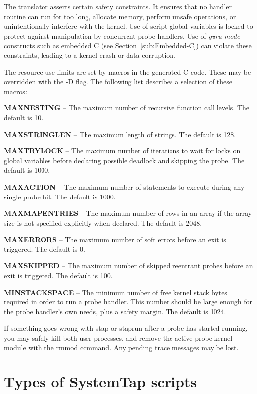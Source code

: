 \documentclass[twoside,english]{article}
\begin{document}
The translator asserts certain safety constraints. It
ensures that no handler routine can run for too long, allocate memory, perform
unsafe operations, or unintentionally interfere with the kernel. Use of script
global variables is locked to protect against manipulation by concurrent
probe handlers. Use of \emph{guru mode} constructs such as embedded C (see
Section~\ref{sub:Embedded-C}) can violate these constraints, leading to
a kernel crash or data corruption.

The resource use limits are set by macros in the generated C code. These
may be overridden with the -D flag. The following list describes a selection
of these macros:

\textbf{MAXNESTING} -- The maximum number of recursive function call levels. The default is 10.

\textbf{MAXSTRINGLEN} -- The maximum length of strings. The default is 128.

\textbf{MAXTRYLOCK} -- The maximum number of iterations to wait for locks on global variables before
declaring possible deadlock and skipping the probe. The default is 1000.

\textbf{MAXACTION} -- The maximum number of statements to execute during any single probe hit. The default is 1000. 

\textbf{MAXMAPENTRIES} -- The maximum number of rows in an array if the array size is not specified
explicitly when declared. The default is 2048.

\textbf{MAXERRORS} -- The maximum number of soft errors before an exit is triggered. The default is 0.

\textbf{MAXSKIPPED} -- The maximum number of skipped reentrant probes before an exit is triggered. The default is 100.

\textbf{MINSTACKSPACE} -- The minimum number of free kernel stack bytes required in order to run a
probe handler. This number should be large enough for the probe handler's
own needs, plus a safety margin.  The default is 1024.

If something goes wrong with stap or staprun after a probe has started running,
you may safely kill both user processes, and remove the active probe kernel
module with the rmmod command. Any pending trace messages may be lost.

\section{Types of SystemTap scripts\label{sec:Types-of-SystemTap}}
\end{document}
